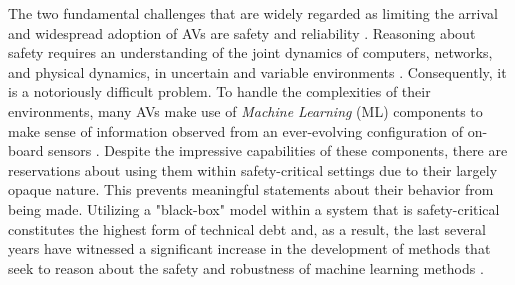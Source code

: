 \documentclass[manuscript,screen,review]{acmart}
\begin{document}
The two fundamental challenges that are widely regarded as limiting the arrival and widespread adoption of AVs are safety and reliability \cite{Majumdar2017}. Reasoning about safety requires an understanding of the joint dynamics of computers, networks, and physical dynamics, in uncertain and variable environments \cite{Yurtsever2019}. Consequently, it is a notoriously difficult problem. To handle the complexities of their environments, many AVs make use of \emph{Machine Learning} (ML) components to make sense of information observed from an ever-evolving configuration of on-board sensors \cite{Yurtsever2019}. Despite the impressive capabilities of these components, there are reservations about using them within safety-critical settings due to their largely opaque nature. This prevents meaningful statements about their behavior from being made. Utilizing a "black-box" model within a system that is safety-critical constitutes the highest form of technical debt \cite{Sculley2015} and, as a result, the last several years have witnessed a significant increase in the development of methods that seek to reason about the safety and robustness of machine learning methods \cite{xiang20118survey}.




\end{document}
